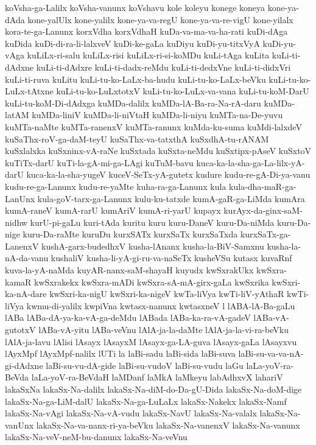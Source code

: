 {koVsha-ga-Lalilx
koVsha-vanunx
koVshavu
kole
koleyu
konege
koneya
kone-ya-dAda
kone-yalUlx
kone-yalilx
kone-ya-va-regU
kone-ya-va-re-vigU
kone-yilalx
kora-te-ga-Lanunx
korxVdha
korxVdhaH
kuDa-va-ma-va-ha-rati
kuDi-dAga
kuDida
kuDi-di-ra-li-lalxveV
kuDi-ke-gaLa
kuDiyu
kuDi-yu-titxVyA
kuDi-yu-vAga
kuLiLx-ri-salu
kuLiLx-risi
kuLiLx-ri-si-koMDu
kuLi-tAga
kuLita
kuLi-ti-dAdxne
kuLi-ti-dAdxre
kuLi-ti-dadx-reMdu
kuLi-ti-dedxVne
kuLi-ti-didxVri
kuLi-ti-ruva
kuLitu
kuLi-tu-ko-LaLx-ba-hudu
kuLi-tu-ko-LaLx-beVku
kuLi-tu-ko-LuLx-tAtxne
kuLi-tu-ko-LuLxtotxV
kuLi-tu-ko-LuLx-va-vana
kuLi-tu-koM-DarU
kuLi-tu-koM-Di-dAdxga
kuMDa-dalilx
kuMDa-lA-Ba-ra-Na-rA-daru
kuMDa-latAM
kuMDa-liniV
kuMDa-li-niVtaH
kuMDa-li-niyu
kuMTa-na-De-yuvu
kuMTa-naMte
kuMTa-ranenxV
kuMTa-ranunx
kuMda-ku-suma
kuMdi-lalxdeV
kuSaThx-roV-ga-daM-teyU
kuSaThx-va-tatxthA
kuSxdhA-tu-rANAM
kuSxlalxka
kuSxninx-vA-raNe
kuSxtada
kuSxta-neMdu
kuSxtipx-pAseV
kuSxtoV
kuTiTx-darU
kuTi-la-gA-mi-ga-LAgi
kuTuM-bavu
kuca-ka-la-sha-ga-La-lilx-yA-darU
kuca-ka-la-sha-yugeV
kuceV-SeTx-yA-gutetx
kudure
kudu-re-gA-Di-ya-vanu
kudu-re-ga-Lanunx
kudu-re-yaMte
kuha-ra-ga-Lanunx
kula
kula-dha-maR-ga-LanUnx
kula-goV-tarx-ga-Lanunx
kulu-ku-tatxde
kumA-gaR-ga-LiMda
kumAra
kumA-raneV
kumA-rarU
kumAriV
kumA-ri-yarU
kupayx
kurAyx-da-ginx-saM-nidhw
kurU-pi-gaLu
kuri-tAda
kuritu
kuru
kuru-DaneV
kuru-Da-niMda
kuru-Da-nige
kuru-Da-raMte
kuruDu
kurxSATx
kurxSaTx
kurxSaTxda
kurxSaTx-ga-LanenxV
kushA-garx-budedhxV
kusha-lAnanx
kusha-la-BiV-Samxnu
kusha-la-nA-da-vanu
kushaliV
kusha-li-yA-gi-ru-va-naSeTx
kusheVSu
kutasx
kuvaRnf
kuva-la-yA-naMda
kuyAR-nanx-saM-shayaH
kuyudx
kwSxrakUkx
kwSxra-kamaR
kwSxrakekx
kwSxra-mADi
kwSxra-sA-mA-girx-gaLa
kwSxrika
kwSxri-ka-nA-dare
kwSxri-ka-nigU
kwSxri-ka-nigeV
kwTa-liVya
kwTi-liV-yAthaR
kwTi-liVya
kwmu-di-yalilx
kwpiVna
kwtasx-nanunx
kwtasxneV
l
lABA-lA-Ba-gaLu
lABa
lABa-dA-ya-ka-vA-ga-deMdu
lABada
lABa-ka-ra-vA-gadeV
lABa-vA-gutotxV
lABa-vA-yitu
lABa-veVnu
lAlA-ja-la-daMte
lAlA-ja-la-vi-ra-beVku
lAlA-ja-lavu
lAlisi
lAsayx
lAsayxM
lAsayx-ga-LA-guva
lAsayx-gaLa
lAsayxvu
lAyxMpf
lAyxMpf-nalilx
lUTi
la
laBi-sadu
laBi-sida
laBi-suva
laBi-su-va-va-nA-gi-dAdxne
laBi-su-vu-dA-gide
laBi-su-vudoV
laBi-su-vudu
laGu
laLa-yoV-ra-BeVda
laLa-yoV-ra-BeVdaH
laMDanf
laMkA
laMkeyu
labAdhxvX
lahariV
lakaSxNa
lakaSx-Na-dalilx
lakaSx-Na-diM-do-Da-gU-Dida
lakaSx-Na-doM-dige
lakaSx-Na-ga-LiM-dalU
lakaSx-Na-ga-LuLaLx
lakaSx-Nakekx
lakaSx-Namf
lakaSx-Na-vAgi
lakaSx-Na-vA-vudu
lakaSx-NavU
lakaSx-Na-valalx
lakaSx-Na-vanUnx
lakaSx-Na-va-nanx-ri-ya-beVku
lakaSx-Na-vanenxV
lakaSx-Na-vanunx
lakaSx-Na-veV-neM-bu-danunx
lakaSx-Na-veVnu
}
